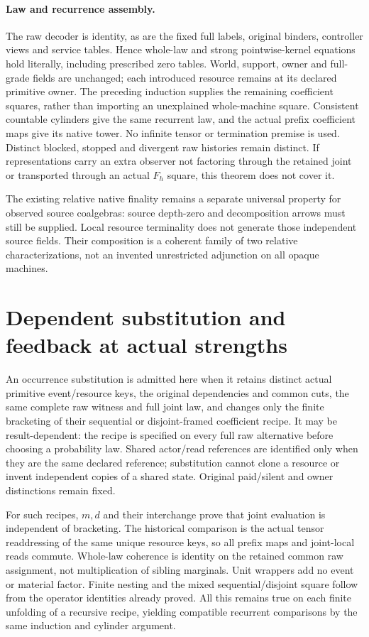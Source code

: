 \documentclass{article}
\begin{document}
\paragraph{Law and recurrence assembly.}
The raw decoder is identity, as are the fixed full labels, original binders, controller views and service tables. Hence whole-law and strong pointwise-kernel equations hold literally, including prescribed zero tables. World, support, owner and full-grade fields are unchanged; each introduced resource remains at its declared primitive owner. The preceding induction supplies the remaining coefficient squares, rather than importing an unexplained whole-machine square. Consistent countable cylinders give the same recurrent law, and the actual prefix coefficient maps give its native tower. No infinite tensor or termination premise is used. Distinct blocked, stopped and divergent raw histories remain distinct. If representations carry an extra observer not factoring through the retained joint or transported through an actual $F_h$ square, this theorem does not cover it.

The existing relative native finality remains a separate universal property for observed source coalgebras: source depth-zero and decomposition arrows must still be supplied. Local resource terminality does not generate those independent source fields. Their composition is a coherent family of two relative characterizations, not an invented unrestricted adjunction on all opaque machines.

\section{Dependent substitution and feedback at actual strengths}
An occurrence substitution is admitted here when it retains distinct actual primitive event/resource keys, the original dependencies and common cuts, the same complete raw witness and full joint law, and changes only the finite bracketing of their sequential or disjoint-framed coefficient recipe. It may be result-dependent: the recipe is specified on every full raw alternative before choosing a probability law. Shared actor/read references are identified only when they are the same declared reference; substitution cannot clone a resource or invent independent copies of a shared state. Original paid/silent and owner distinctions remain fixed.

For such recipes, $m,d$ and their interchange prove that joint evaluation is independent of bracketing. The historical comparison is the actual tensor readdressing of the same unique resource keys, so all prefix maps and joint-local reads commute. Whole-law coherence is identity on the retained common raw assignment, not multiplication of sibling marginals. Unit wrappers add no event or material factor. Finite nesting and the mixed sequential/disjoint square follow from the operator identities already proved. All this remains true on each finite unfolding of a recursive recipe, yielding compatible recurrent comparisons by the same induction and cylinder argument.
\end{document}
